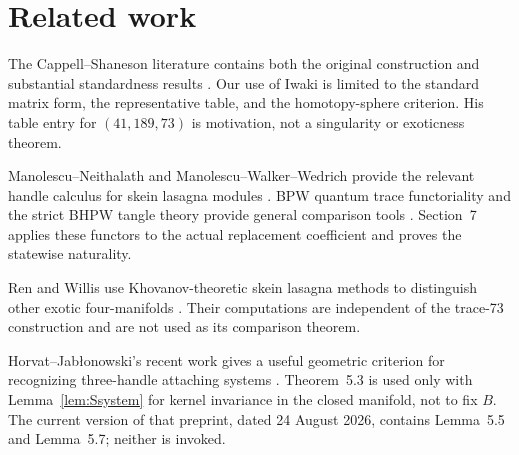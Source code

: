 \section{Related work}

The Cappell--Shaneson literature contains both the original construction
\cite{CappellShaneson1976,AitchisonRubinstein1984} and substantial
standardness results
\cite{Akbulut2010,Gompf2010,KimYamada2017,Iwaki2024}.  Our use of Iwaki is
limited to the standard matrix form, the representative table, and the
homotopy-sphere criterion.  His table entry for $(41,189,73)$ is motivation,
not a singularity or exoticness theorem.

Manolescu--Neithalath and Manolescu--Walker--Wedrich provide the relevant
handle calculus for skein lasagna modules
\cite{ManolescuNeithalath2020,ManolescuWalkerWedrich2023}.  BPW quantum trace
functoriality and the strict BHPW tangle theory provide general comparison
tools \cite{BeliakovaPutyraWehrli2019,
BeliakovaHogancampPutyraWehrli2023}.  Section~7 applies these functors to the
actual replacement coefficient and proves the statewise naturality.

Ren and Willis use Khovanov-theoretic skein lasagna methods to distinguish
other exotic four-manifolds \cite{RenWillis2024}.  Their computations are
independent of the trace-73 construction and are not used as its comparison
theorem.

Horvat--Jab\l{}onowski's recent work gives a useful geometric criterion for
recognizing three-handle attaching systems \cite{HorvatJablonowski2025}.
Theorem~5.3 is used only with Lemma~\ref{lem:Ssystem} for kernel invariance
in the closed manifold, not to fix $B$.  The current version of that preprint,
dated 24 August 2026, contains Lemma~5.5 and Lemma~5.7; neither is invoked.
